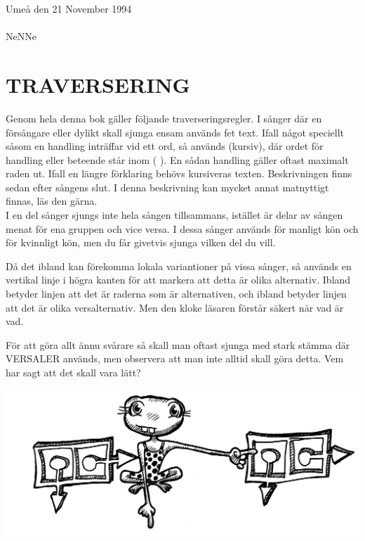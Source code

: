 \documentclass[a6paper,fontsize=10pt,twoside,open=right]{scrbook}
\newcommand*\cleartoleftpage{%
  \clearpage
  \ifodd\value{page}\hbox{}\newpage\fi
}
\begin{document}
\noindent Umeå den 21 November
1994\\ \\ NeNNe
\cleartoleftpage
\section{TRAVERSERING}\vspace{10pt}
\hspace{10pt}Genom hela denna bok gäller följande
traverseringsregler. I sånger där en försångare eller dylikt skall
sjunga ensam används fet text. Ifall något speciellt såsom en handling
inträffar vid ett ord, så används (kursiv), där ordet för handling
eller beteende står inom ( ). En sådan handling gäller oftast maximalt
raden ut. Ifall en längre förklaring behövs kursiveras
texten. Beskrivningen finns sedan efter sångens slut. I denna
beskrivning kan mycket annat matnyttigt finnas, läs den
gärna.\\ \indent I en del sånger sjungs inte hela sången tillsammans,
istället är delar av sången menat för ena gruppen och vice versa. I
dessa sånger används {\Large\Male} för manligt kön och {\Large\Female}
för kvinnligt kön, men du får givetvis sjunga vilken del du vill.
\begin{leftborder}
  \hspace{10pt}Då det ibland kan förekomma lokala variantioner på vissa sånger, så
  används en  vertikal linje i högra kanten för att markera att detta
  är olika alternativ. Ibland betyder linjen att det är raderna som är
  alternativen, och ibland betyder linjen att det är olika
  versalternativ. Men den kloke läsaren förstår säkert när vad är vad.
\end{leftborder}
\hspace{15pt} För att göra allt ännu svårare så skall man oftast sjunga med stark
stämma där VERSALER används, men observera att man inte alltid skall
göra detta. Vem har sagt att det skall vara lätt?
\newpage
\cleardoublepage
\renewcommand{\contentsname}{\vspace{-2.17cm}\rmfamily{\fontsize{13}{15}\textbf{INNEHÅLL}}\vspace{-1.2cm}}
\tableofcontents\par
\vfill
\noindent\includegraphics[keepaspectratio,width=\textwidth]{elements/groda.jpg}
\vfill
\renewcommand{\leftmark}{}
\end{document}

